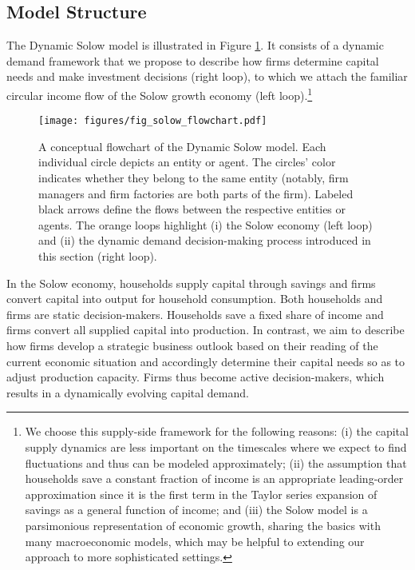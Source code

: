 \documentclass[authoryear, review]{elsarticle}
\begin{document}
\subsection{Model Structure}\label{sec_model_structure}
The Dynamic Solow model is illustrated in Figure \ref{fig_solow_flowchart}. It consists of a dynamic demand framework that we propose to describe how firms determine capital needs and make investment decisions (right loop), to which we attach the familiar circular income flow of the Solow growth economy (left loop).\footnote{
	We choose this supply-side framework for the following reasons: (i) the capital supply dynamics are less important on the timescales where we expect to find fluctuations and thus can be modeled approximately; (ii) the assumption that households save a constant fraction of income is an appropriate leading-order approximation since it is the first term in the Taylor series expansion of savings as a general function of income; and (iii) the Solow model is a parsimonious representation of economic growth, sharing the basics with many macroeconomic models, which may be helpful to extending our approach to more sophisticated settings.
} 

\begin{figure}[htb!]
    \centering
    \texttt{[image: figures/fig\_solow\_flowchart.pdf]}
    \caption{A conceptual flowchart of the Dynamic Solow model. Each individual circle depicts an entity or agent. The circles' color indicates whether they belong to the same entity (notably, firm  managers and firm factories are both parts of the firm). Labeled black arrows define the flows between the respective entities or agents. The orange loops highlight (i) the Solow economy (left loop) and (ii) the dynamic demand decision-making process introduced in this section (right loop).}
    \label{fig_solow_flowchart}
\end{figure}

In the Solow economy, households supply capital through savings and firms convert capital into output for household consumption. Both households and firms are static decision-makers. Households save a fixed share of income and firms convert all supplied capital into production. In contrast, we aim to describe how firms develop a strategic business outlook based on their reading of the current economic situation and accordingly determine their capital needs so as to adjust production capacity. Firms thus become active decision-makers, which results in a dynamically evolving capital demand.
\end{document}
